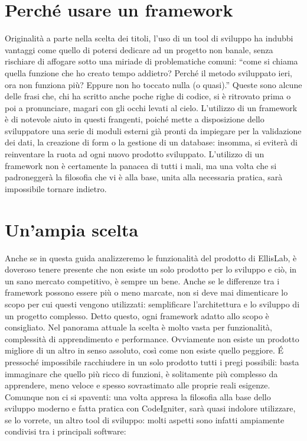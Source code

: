 \section*{Perch\'e usare un framework}
Originalità a parte nella scelta dei titoli, l'uso di un tool di sviluppo ha indubbi vantaggi come quello di potersi dedicare ad un progetto non banale, senza rischiare di affogare sotto una miriade di problematiche comuni: ``come si chiama quella funzione che ho creato tempo addietro? Perché il metodo sviluppato ieri, ora non funziona più? Eppure non ho toccato nulla (o quasi).'' Queste sono alcune delle frasi che, chi ha scritto anche poche righe di codice, si è ritrovato prima o poi a pronunciare, magari con gli occhi levati al cielo. L'utilizzo di un framework è di notevole aiuto in questi frangenti, poiché mette a disposizione dello sviluppatore una serie di moduli esterni già pronti da impiegare per la validazione dei dati, la creazione di form o la gestione di un database: insomma, si eviterà di reinventare la ruota ad ogni nuovo prodotto sviluppato. L'utilizzo di un framework non è certamente la panacea di tutti i mali, ma una volta che si padroneggerà la filosofia che vi è alla base, unita alla necessaria pratica, sarà impossibile tornare indietro.

\section*{Un'ampia scelta}
Anche se in questa guida analizzeremo le funzionalità del prodotto di EllisLab, è doveroso tenere presente che non esiste un solo prodotto per lo sviluppo e ciò, in un sano mercato competitivo, è sempre un bene. Anche se le differenze tra i framework possono essere più o meno marcate, non si deve mai dimenticare lo scopo per cui questi vengono utilizzati: semplificare l'architettura e lo sviluppo di un progetto complesso. Detto questo, ogni framework adatto allo scopo è consigliato. Nel panorama attuale la scelta è molto vasta per funzionalità, complessità di apprendimento e performance. Ovviamente non esiste un prodotto migliore di un altro in senso assoluto, così come non esiste quello peggiore. \'E pressoché impossibile racchiudere in un solo prodotto tutti i pregi possibili: basta immaginare che quello più ricco di funzioni, è solitamente più complesso da apprendere, meno veloce e spesso sovrastimato alle proprie reali esigenze. Comunque non ci si spaventi: una volta appresa la filosofia alla base dello sviluppo moderno e fatta pratica con CodeIgniter, sarà quasi indolore utilizzare, se lo vorrete, un altro tool di sviluppo: molti aspetti sono infatti ampiamente condivisi tra i principali software:

